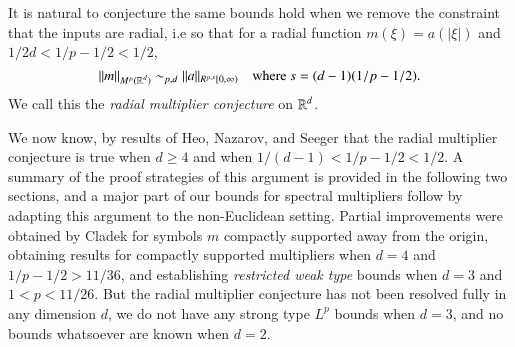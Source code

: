 
It is natural to conjecture the same bounds hold when we remove the constraint that the inputs are radial, i.e so that for a radial function $m(\xi) = a(|\xi|)$ and $1/2d < 1/p - 1/2 < 1/2$,
%
\begin{equation} \label{RadialMultiplierBound}
  \| m \|_{M^p(\operatorname{\mathbb{R}}^d)} \sim_{p,d} \| a \|_{R^{p,s}[0,\infty)} \quad\text{where $s = (d-1)(1/p - 1/2)$}.
\end{equation}
%
%
%
We call this the \emph{radial multiplier conjecture} on $\operatorname{\mathbb{R}}^d$.

We now know, by results of Heo, Nazarov, and Seeger \cite{HeoandNazarovandSeeger} that the radial multiplier conjecture is true when $d \geq 4$ and when $1/(d-1) < 1/p - 1/2 < 1/2$. A summary of the proof strategies of this argument is provided in the following two sections, and a major part of our bounds for spectral multipliers follow by adapting this argument to the non-Euclidean setting. Partial improvements were obtained by Cladek \cite{Cladek} for symbols $m$ compactly supported away from the origin, obtaining results for compactly supported multipliers when $d = 4$ and $1/p - 1/2 > 11/36$, and establishing \emph{restricted weak type} bounds when $d = 3$ and $1 < p < 11/26$. %
But the radial multiplier conjecture has not been resolved fully in any dimension $d$, we do not have any strong type $L^p$ bounds when $d = 3$, and no bounds whatsoever are known when $d = 2$.

